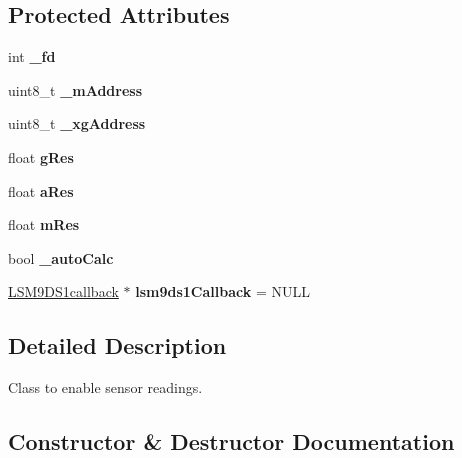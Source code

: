 \subsection*{Protected Attributes}
\begin{DoxyCompactItemize}
\item 
\mbox{\label{classLSM9DS1_a8a6a3c8b294acfcf11342f602864dc42}} 
int {\bfseries \+\_\+fd}
\item 
\mbox{\label{classLSM9DS1_a7141933a2ccde95976e4eecd598ecb17}} 
uint8\+\_\+t {\bfseries \+\_\+m\+Address}
\item 
\mbox{\label{classLSM9DS1_ac78b7fab605570a16433a4636f91451e}} 
uint8\+\_\+t {\bfseries \+\_\+xg\+Address}
\item 
\mbox{\label{classLSM9DS1_a2d8654ebb35177088a67e67a944bd998}} 
float {\bfseries g\+Res}
\item 
\mbox{\label{classLSM9DS1_acdc1f9b300b3c349e17dd21c9bb37c40}} 
float {\bfseries a\+Res}
\item 
\mbox{\label{classLSM9DS1_aac7ae43adf399e8052464b966aec8472}} 
float {\bfseries m\+Res}
\item 
\mbox{\label{classLSM9DS1_a8460d00ea0bb496c5d49190a34e54588}} 
bool {\bfseries \+\_\+auto\+Calc}
\item 
\mbox{\label{classLSM9DS1_aa2be4bac7f3b70c3fb11126e06a240b4}} 
\hyperlink{classLSM9DS1callback}{L\+S\+M9\+D\+S1callback} $\ast$ {\bfseries lsm9ds1\+Callback} = N\+U\+LL
\end{DoxyCompactItemize}


\subsection{Detailed Description}
Class to enable sensor readings. 

\subsection{Constructor \& Destructor Documentation}
\mbox{\label{classLSM9DS1_ab62923063ffc49dca82e6f311c5c8764}} 
